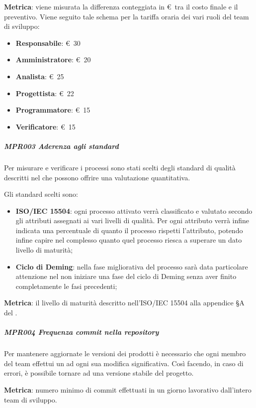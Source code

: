				\textbf{Metrica}: viene misurata la differenza conteggiata in \euro\ tra il costo finale e il preventivo.
				Viene seguito tale schema per la tariffa oraria dei vari ruoli del team di sviluppo:

				\begin{itemize} %
					\item \textbf{Responsabile}: \euro\ 30
					\item \textbf{Amministratore}: \euro\ 20
					\item \textbf{Analista}: \euro\ 25
					\item \textbf{Progettista}: \euro\ 22
					\item \textbf{Programmatore}: \euro\ 15
					\item \textbf{Verificatore}: \euro\ 15
				\end{itemize}

				\subparagraph{MPR003 Aderenza agli standard}
				Per misurare e verificare i processi sono stati scelti degli standard di qualità descritti nel \Doc{\PdQv} che possono offrire una valutazione quantitativa.

				Gli standard scelti sono:

				\begin{itemize}
				\item \textbf{ISO/IEC 15504}: ogni processo attivato verrà classificato e valutato secondo gli attributi assegnati ai vari livelli di qualità.
					Per ogni attributo verrà infine indicata una percentuale di quanto il processo rispetti l'attributo, potendo infine capire nel complesso quanto
					quel processo riesca a superare un dato livello di maturità;
				\item \textbf{Ciclo di Deming}: nella fase migliorativa del processo sarà data particolare attenzione nel non iniziare una fase del ciclo di Deming
					senza aver finito completamente le fasi precedenti;
				\end{itemize}

				\textbf{Metrica}: il livello di maturità descritto nell'ISO/IEC 15504 alla appendice §A del \Doc{\PdQv}.

				\subparagraph{MPR004 Frequenza commit nella repository}
				Per mantenere aggiornate le versioni dei prodotti è necessario che ogni membro del team effettui un  ad ogni sua modifica significativa.
				Così facendo, in caso di errori, è possibile tornare ad una versione stabile del progetto.

				\textbf{Metrica}: numero minimo di commit effettuati in un giorno lavorativo dall'intero team di sviluppo.


